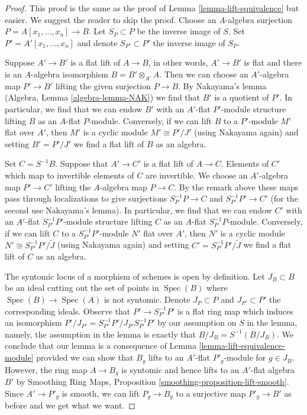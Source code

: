 \documentclass[10pt,a4paper]{amsart}
\theoremstyle{plain}
\theoremstyle{definition}
\theoremstyle{remark}
\numberwithin{equation}{subsection}
\def\Spec{\mathop{\mathrm{Spec}}}
\begin{document}
\begin{proof}
This proof is the same as the proof of
Lemma \ref{lemma-lift-equivalence} but easier. We suggest the
reader to skip the proof.
Choose an $A$-algebra surjection $P = A[x_1, \ldots, x_n] \to B$.
Let $S_P \subset P$ be the inverse image of $S$.
Set $P' = A'[x_1, \ldots, x_n]$ and denote $S_{P'} \subset P'$
the inverse image of $S_P$.

\medskip\noindent
Suppose $A' \to B'$ is a flat lift of $A \to B$, in other words,
$A' \to B'$ is flat and there is an $A$-algebra isomorphism
$B = B' \otimes_{A'} A$. Then we can choose an $A'$-algebra map
$P' \to B'$ lifting the given surjection $P \to B$.
By Nakayama's lemma (Algebra, Lemma \ref{algebra-lemma-NAK})
we find that $B'$ is a quotient of $P'$. In particular, we find
that we can endow $B'$ with an $A'$-flat $P'$-module structure
lifting $B$ as an $A$-flat $P$-module.
Conversely, if we can lift $B$ to a $P'$-module $M'$ flat over $A'$,
then $M'$ is a cyclic module $M' \cong P'/J'$ (using Nakayama again)
and setting $B' = P'/J'$ we find a flat lift of $B$ as an algebra.

\medskip\noindent
Set $C = S^{-1}B$. Suppose that $A' \to C'$ is a flat lift of $A \to C$.
Elements of $C'$ which map to invertible elements of $C$ are invertible.
We choose an $A'$-algebra map $P' \to C'$ lifting
the $A$-algebra map $P \to C$. By the remark above
these maps pass through localizations to give surjections
$S_P^{-1}P \to C$ and $S_{P'}^{-1}P' \to C'$
(for the second use Nakayama's lemma).
In particular, we find that we can endow $C'$ with an $A'$-flat
$S_{P'}^{-1}P'$-module structure lifting $C$ as an $A$-flat
$S_P^{-1}P$-module. Conversely, if we can lift $C$ to a
$S_{P'}^{-1}P'$-module $N'$ flat over $A'$, then $N'$
is a cyclic module $N' \cong S_{P'}^{-1}P'/\tilde J$
(using Nakayama again) and setting $C' = S_{P'}^{-1}P'/\tilde J$
we find a flat lift of $C$ as an algebra.

\medskip\noindent
The syntomic locus of a morphism of schemes is open by definition.
Let $J_B \subset B$ be an ideal cutting out the set of points
in $\Spec(B)$ where $\Spec(B) \to \Spec(A)$ is not syntomic.
Denote $J_P \subset P$ and $J_{P'} \subset P'$ the corresponding
ideals. Observe that $P' \to S_{P'}^{-1}P'$ is a flat ring map which
induces an isomorphism $P'/J_{P'} = S_{P'}^{-1}P'/J_{P'}S_{P'}^{-1}P'$
by our assumption on $S$ in the lemma, namely, the assumption
in the lemma is exactly that $B/J_B = S^{-1}(B/J_B)$.
We conclude that our lemma is a consequence of
Lemma \ref{lemma-lift-equivalence-module} provided we can
show that $B_g$ lifts to an $A'$-flat $P'_g$-module for
$g \in J_B$. However, the ring map $A \to B_g$ is syntomic
and hence lifts to an $A'$-flat algebra $B'$ by
Smoothing Ring Maps, Proposition \ref{smoothing-proposition-lift-smooth}.
Since $A' \to P'_g$ is smooth, we can lift $P_g \to B_g$
to a surjective map $P'_g \to B'$ as before and we get what we want.
\end{proof}
\end{document}
